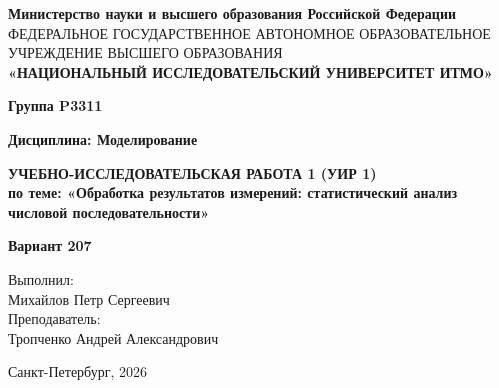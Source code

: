 \documentclass[a4paper,12pt]{article}
\begin{document}
\begin{titlepage}
    \centering
    {\fontsize{11}{13}\selectfont \textbf{Министерство науки и высшего образования Российской Федерации}} \\
    {\fontsize{7}{10}\selectfont ФЕДЕРАЛЬНОЕ ГОСУДАРСТВЕННОЕ АВТОНОМНОЕ ОБРАЗОВАТЕЛЬНОЕ УЧРЕЖДЕНИЕ ВЫСШЕГО ОБРАЗОВАНИЯ} \\
    \vspace{0.2cm} 
    {\fontsize{14}{17}\selectfont \textbf{«НАЦИОНАЛЬНЫЙ ИССЛЕДОВАТЕЛЬСКИЙ УНИВЕРСИТЕТ ИТМО»}}
    
    \vspace{1cm} 
    
    {\fontsize{12}{14}\selectfont \textbf{Группа P3311}}
    
    \vspace{1cm}
    
    {\fontsize{12}{14}\selectfont \textbf{Дисциплина: Моделирование}}
    
    \vspace*{\fill}
    
    {\fontsize{18}{22}\selectfont \textbf{УЧЕБНО-ИССЛЕДОВАТЕЛЬСКАЯ РАБОТА 1 (УИР 1)}} \\
    \vspace{0.5cm}
    {\fontsize{14}{17}\selectfont \textbf{по теме: «Обработка результатов измерений: статистический анализ числовой последовательности»}}
    
    \vspace{2cm}
    
    {\fontsize{12}{14}\selectfont \textbf{Вариант 207}}
    
    \vspace{2cm}
    
    \begin{flushright}
        \fontsize{12}{14}\selectfont
        Выполнил: \\
        Михайлов Петр Сергеевич \\
        \vspace{1em}
        Преподаватель: \\
        Тропченко Андрей Александрович
    \end{flushright}
    
    \vfill
    
    {\fontsize{12}{14}\selectfont
    Санкт-Петербург, 2026
    }
\end{titlepage}
\end{document}
